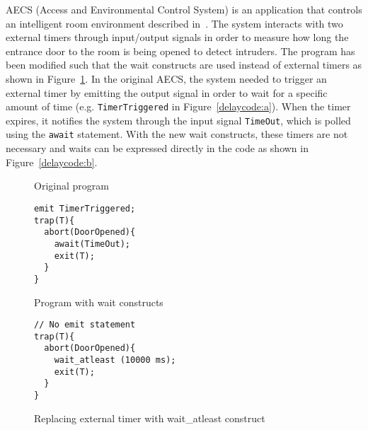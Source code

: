 
AECS (Access and Environmental Control System) is an application that
controls an intelligent room environment described
in~\cite{aecs_ispa}. The system interacts with two external timers
through input/output signals in order to measure how long the entrance
door to the room is being opened to detect intruders.  The program has
been modified such that the wait constructs are used instead of external
timers as shown in Figure~\ref{delaycode}. In the original AECS, the
system needed to trigger an external timer by emitting the output signal
in order to wait for a specific amount of time (e.g.
\texttt{TimerTriggered} in Figure~\ref{delaycode:a}). When the timer
expires, it notifies the system through the input signal
\texttt{TimeOut}, which is polled using the \texttt{await}
statement. With the new wait constructs, these timers are not necessary
and waits can be expressed directly in the code as shown in
Figure~\ref{delaycode:b}.

\begin{figure}[h!]
	\vspace{-10pt}
	\centering
  \begin{SubFloat}{\label{delaycode:a}Original program}
      \scriptsize
		\begin{lstlisting}[style=sysj,morekeywords={abort,await,emit,present,trap,pause,exit,suspend}]
emit TimerTriggered;
trap(T){
  abort(DoorOpened){
    await(TimeOut);
    exit(T); 
  }
}
\end{lstlisting}
  \end{SubFloat}
  \hspace{1cm}%
  \begin{SubFloat}{\label{delaycode:b}Program with wait constructs}
		\begin{lstlisting}[style=sysj,morekeywords={abort,await,emit,present,trap,pause,exit,wait_atleast,suspend}]
// No emit statement
trap(T){
  abort(DoorOpened){
    wait_atleast (10000 ms);
    exit(T);  
  }
}
\end{lstlisting}
	\end{SubFloat}
\caption{Replacing external timer with wait\_atleast construct}
\label{delaycode}
\end{figure}



